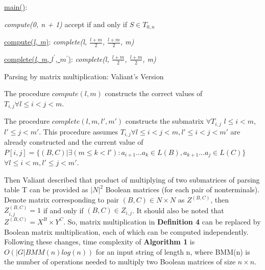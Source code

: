 \documentclass{article}
\begin{document}
  
\begin{algorithm}
\SetAlgoNoLine
{}
\underline{main()}{:}{
 
 \textit{compute(0, n + 1)\;}
 accept if and only if $S \in T_{0, n}$
 \linebreak
 }
 
\underline{compute(\textit{l, m})}{:}{
 \textit{complete(l, $\frac{l+m}{2}$, $\frac{l+m}{2}$, m)}
 \linebreak
 }
 
\underline{complete(\textit{l, m}, $l^\prime$, $m^\prime$)}{:}{
 }
  \textit{complete(l, $\frac{l+m}{2}$, $\frac{l+m}{2}$, m)}
 
\caption{Parsing by matrix multiplication:  Valiant's Version}
\end{algorithm}

The procedure $compute(l, m)$ constructs the correct values of $T_{i,j} \forall l \le i < j < m$.

The procedure $complete(l, m, l', m')$ constructs the submatrix $\forall T_{i, j}$ $l \le i < m$, $l' \le j < m'$. This procedure assumes $T_{i, j} \forall l \leq i < j < m,  l' \leq i < j < m'$ are already constructed and the current value of  $P[i, j] =  \{ (B, C) |\exists (m \le k < l'): a_{i + 1}...a_{k} \in L(B), a_{k + 1}...a_{j} \in L(C)\}$ $\forall l \leq i < m,  l' \leq j < m'$. 

Then Valiant described that product of multiplying of two submatrices of parsing table T can be provided as $|N|^2$ Boolean matrices (for each pair of nonterminals). Denote matrix corresponding to pair $(B, C) \in N \times N$ as $Z^{(B, C)}$, then $Z_{i, j}^{(B, C)} = 1$ if and only if $(B, C) \in Z_{i, j}$. It should also be noted that $Z^{(B, C)} = X^{B} \times Y^{C}$. So, matrix multiplication in \textbf{Definition 4} can be replaced by Boolean matrix multiplication, each of which can be computed independently. Following these changes, time complexity of \textbf{Algorithm 1} is $O(|G|BMM(n)log(n))$ for an input string of length n, where BMM(n) is the number of operations needed to multiply two Boolean matrices of size $n \times n$.
\end{document}
